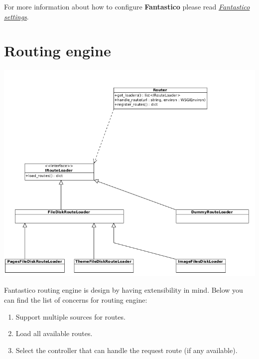 \documentclass[letterpaper,10pt,english]{sphinxmanual}
\begin{document}
For more information about how to configure \textbf{Fantastico} please read {\hyperref[get_started/settings::doc]{\emph{Fantastico settings}}}.


\section{Routing engine}
\label{features/routing_engine:routing-engine}\label{features/routing_engine::doc}
\includegraphics{routing_engine.png}

Fantastico routing engine is design by having extensibility in mind. Below you can find the list of concerns for routing engine:
\begin{enumerate}
\item {} 
Support multiple sources for routes.

\item {} 
Load all available routes.

\item {} 
Select the controller that can handle the request route (if any available).

\end{enumerate}
\end{document}
